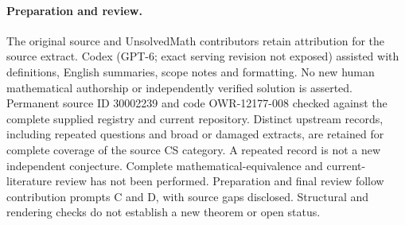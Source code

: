 \documentclass[11pt]{article}
\begin{document}
\paragraph{Preparation and review.}
The original source and UnsolvedMath contributors retain attribution for the source extract. Codex (GPT-6; exact serving revision not exposed) assisted with definitions, English summaries, scope notes and formatting. No new human mathematical authorship or independently verified solution is asserted. Permanent source ID 30002239 and code OWR-12177-008 checked against the complete supplied registry and current repository. Distinct upstream records, including repeated questions and broad or damaged extracts, are retained for complete coverage of the source CS category. A repeated record is not a new independent conjecture. Complete mathematical-equivalence and current-literature review has not been performed. Preparation and final review follow contribution prompts C and D, with source gaps disclosed. Structural and rendering checks do not establish a new theorem or open status.
\label{end:30002239}
\end{document}
